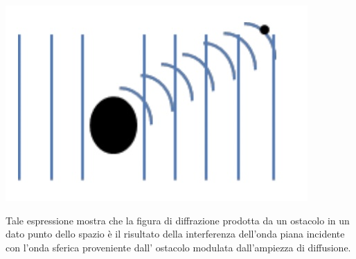 \begin{marginfigure}
	\centering
	\includegraphics{figs/kirchhoff-diffraction-4}
	\label{fig:kirchhoff4}
\end{marginfigure}

Tale espressione mostra che la figura di diffrazione prodotta da un ostacolo in un dato punto dello spazio è il risultato della interferenza dell'onda piana incidente con l'onda sferica proveniente dall' ostacolo modulata dall'ampiezza di diffusione.
